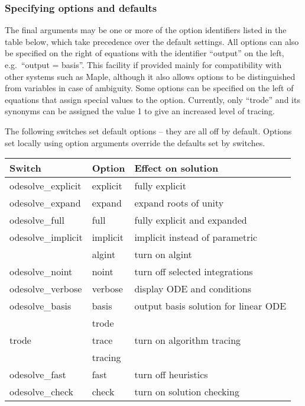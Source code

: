 \subsubsection{Specifying options and defaults}

The final arguments may be one or more of the option identifiers
listed in the table below, which take precedence over the default
settings.  All options can also be specified on the right of equations
with the identifier ``output'' on the left, e.g.\ ``output = basis''.
This facility if provided mainly for compatibility with other systems
such as Maple, although it also allows options to be distinguished
from variables in case of ambiguity.  Some options can be specified on
the left of equations that assign special values to the option.
Currently, only ``trode'' and its synonyms can be assigned the value 1
to give an increased level of tracing.

The following switches set default options -- they are all off by
default.  Options set locally using option arguments override the
defaults set by switches.
\begin{center}
\begin{tabular}{lll}
\bf Switch         & \bf Option  & \bf Effect on solution \\
\hline
odesolve\_explicit & explicit    & fully explicit \\
odesolve\_expand   & expand      & expand roots of unity \\
odesolve\_full     & full        & fully explicit and expanded \\
odesolve\_implicit & implicit    & implicit instead of parametric \\
                   & algint      & turn on algint \\
odesolve\_noint    & noint       & turn off selected integrations \\
odesolve\_verbose  & verbose     & display ODE and conditions \\
odesolve\_basis    & basis       & output basis solution for linear ODE \\
                   & trode \\
trode              & trace       & turn on algorithm tracing \\
                   & tracing \\
odesolve\_fast     & fast        & turn off heuristics \\
odesolve\_check    & check       & turn on solution checking
\end{tabular}
\end{center}

